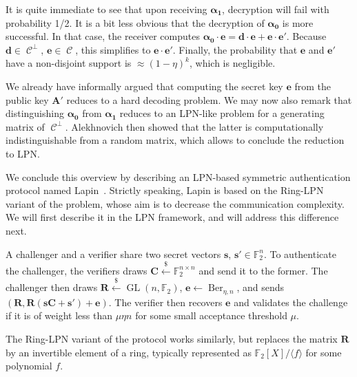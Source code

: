 \documentclass[11pt,a4paper]{article}
\theoremstyle{definition}
\DeclareMathOperator\code{\mathcal{C}}
\DeclareMathOperator\Ber{Ber}
\DeclareMathOperator\gl{GL}
\newcommand\ftwo{\mathbb{F}_{2}}
\newcommand\randraw{\xleftarrow{{\scriptscriptstyle\$}}}
\begin{document}
It is quite immediate to see that upon receiving $\bm{\alpha_1}$, decryption will fail with probability 1/2. It is a bit less obvious that the decryption
of $\bm{\alpha_0}$ is more successful. In that case, the receiver computes $\bm{\alpha_0} \cdot \bm{e} = \bm{d}\cdot\bm{e} + \bm{e}\cdot\bm{e}'$. Because
$\bm{d} \in \code^\bot$, $\bm{e} \in \code$, this simplifies to $\bm{e}\cdot\bm{e}'$. Finally, the probability that $\bm{e}$ and $\bm{e}'$ have a non-disjoint
support is $\approx (1-\eta)^k$, which is negligible.

We already have informally argued that computing the secret key $\bm{e}$ from the public key $\bm{A}'$ reduces to a hard decoding problem. We may now also
remark that distinguishing $\bm{\alpha_0}$ from $\bm{\alpha_1}$ reduces to an LPN-like problem for a generating matrix of $\code^\bot$. Alekhnovich then
showed that the latter is computationally indistinguishable from a random matrix, which allows to conclude the reduction to LPN.

\medskip

We conclude this overview by describing an LPN-based symmetric authentication protocol named Lapin~\cite{lapin}. Strictly speaking, Lapin is based on the Ring-LPN variant
of the problem, whose aim is to decrease the communication complexity. We will first describe it in the LPN framework, and will address this difference next.

A challenger and a verifier share two secret vectors $\bm{s}$, $\bm{s}' \in \ftwo^n$. To authenticate the challenger, the verifiers draws $\bm{C} \randraw \ftwo^{n\times n}$
and send it to the former. The challenger then draws $\bm{R} \randraw \gl(n, \ftwo)$, $\bm{e} \leftarrow \Ber_{\eta,n}$, and sends $(\bm{R}, \bm{R}(\bm{s}\bm{C} + \bm{s}') + \bm{e})$.
The verifier then recovers $\bm{e}$ and validates the challenge if it is of weight less than $\mu \eta n$ for some small acceptance threshold $\mu$.

The Ring-LPN variant of the protocol works similarly, but replaces the matrix $\bm{R}$ by an invertible element of a ring, typically represented as $\ftwo[X]/\langle f \rangle$ for
some polynomial $f$.










\end{document}
